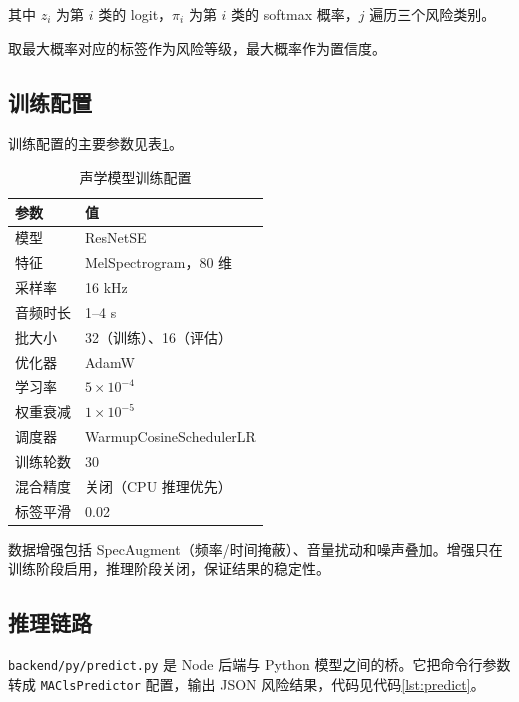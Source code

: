 \documentclass[UTF8,11pt,a4paper,fontset=none]{ctexart}
\begin{document}
其中 \(z_i\) 为第 \(i\) 类的 logit，\(\pi_i\) 为第 \(i\) 类的 softmax 概率，\(j\) 遍历三个风险类别。

取最大概率对应的标签作为风险等级，最大概率作为置信度。

\subsection{训练配置}

训练配置的主要参数见表\ref{tab:train}。

\begin{table}[H]
\centering
\small
\caption{声学模型训练配置}
\label{tab:train}
\begin{tabular}{p{5cm}p{8cm}}
\toprule
参数 & 值 \\
\midrule
模型 & ResNetSE \\
特征 & MelSpectrogram，80 维 \\
采样率 & 16 kHz \\
音频时长 & 1--4 s \\
批大小 & 32（训练）、16（评估） \\
优化器 & AdamW \\
学习率 & \(5\times10^{-4}\) \\
权重衰减 & \(1\times10^{-5}\) \\
调度器 & WarmupCosineSchedulerLR \\
训练轮数 & 30 \\
混合精度 & 关闭（CPU 推理优先） \\
标签平滑 & 0.02 \\
\bottomrule
\end{tabular}
\end{table}

数据增强包括 SpecAugment（频率/时间掩蔽）、音量扰动和噪声叠加。增强只在训练阶段启用，推理阶段关闭，保证结果的稳定性。

\subsection{推理链路}

\texttt{backend/py/predict.py} 是 Node 后端与 Python 模型之间的桥。它把命令行参数转成 \texttt{MAClsPredictor} 配置，输出 JSON 风险结果，代码见代码\ref{lst:predict}。
\end{document}

